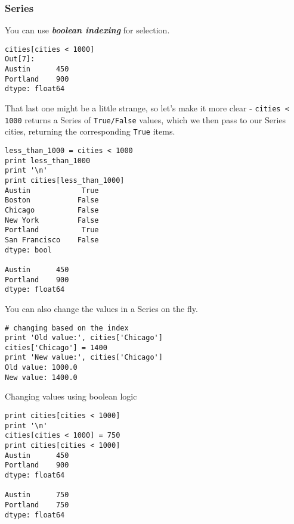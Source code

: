 \begin{frame}[fragile]\frametitle{Series}		
You can use \textbf{\textit{boolean indexing}} for selection.
\begin{lstlisting}
cities[cities < 1000]
Out[7]:
Austin      450
Portland    900
dtype: float64
\end{lstlisting}
\end{frame}

\begin{frame}[fragile]
That last one might be a little strange, so let's make it more clear - \texttt{cities < 1000} returns a Series of \texttt{True/False} values, which we then pass to our Series cities, returning the corresponding \texttt{True} items.
\end{frame}

\begin{frame}[fragile]
\begin{lstlisting}
less_than_1000 = cities < 1000
print less_than_1000
print '\n'
print cities[less_than_1000]
Austin            True
Boston           False
Chicago          False
New York         False
Portland          True
San Francisco    False
dtype: bool

Austin      450
Portland    900
dtype: float64
\end{lstlisting}
\end{frame}

\begin{frame}[fragile]
You can also change the values in a Series on the fly.
\begin{lstlisting}
# changing based on the index
print 'Old value:', cities['Chicago']
cities['Chicago'] = 1400
print 'New value:', cities['Chicago']
Old value: 1000.0
New value: 1400.0
\end{lstlisting}
\end{frame}

\begin{frame}[fragile]	
Changing values using boolean logic
\begin{lstlisting}
print cities[cities < 1000]
print '\n'
cities[cities < 1000] = 750
print cities[cities < 1000]
Austin      450
Portland    900
dtype: float64

Austin      750
Portland    750
dtype: float64
\end{lstlisting}
\end{frame}

